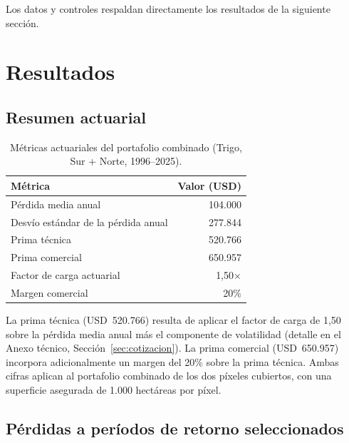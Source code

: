\documentclass[11pt,a4paper]{article}
\begin{document}
Los datos y controles respaldan directamente los resultados de la siguiente sección.

\section{Resultados}
\label{sec:resultados}

\subsection*{Resumen actuarial}

\renewcommand{\arraystretch}{1.3}
\begin{table}[ht]
  \centering
  \caption{Métricas actuariales del portafolio combinado (Trigo, Sur + Norte, 1996--2025).}
  \label{tab:actuarial}
  \begin{tabular}{lr}
    \toprule
    \textbf{Métrica} & \textbf{Valor (USD)} \\
    \midrule
    Pérdida media anual                     & 104.000 \\
    Desvío estándar de la pérdida anual     & 277.844 \\
    Prima técnica                           & 520.766 \\
    Prima comercial                         & 650.957 \\
    \midrule
    Factor de carga actuarial               & 1,50$\times$ \\
    Margen comercial                        & 20\% \\
    \bottomrule
  \end{tabular}
\end{table}

La prima técnica (USD~520.766) resulta de aplicar el factor de carga de 1,50 sobre la pérdida media anual más el componente de volatilidad (detalle en el Anexo técnico, Sección~\ref{sec:cotizacion}). La prima comercial (USD~650.957) incorpora adicionalmente un margen del 20\% sobre la prima técnica. Ambas cifras aplican al portafolio combinado de los dos píxeles cubiertos, con una superficie asegurada de 1.000 hectáreas por píxel.

\subsection*{Pérdidas a períodos de retorno seleccionados}
\end{document}
